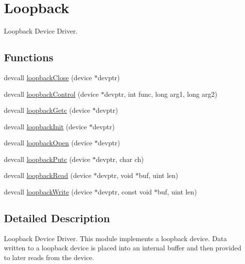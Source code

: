 \hypertarget{group__loopback}{\section{Loopback}
\label{group__loopback}
}


Loopback Device Driver.  


\subsection*{Functions}
\begin{DoxyCompactItemize}
\item 
devcall \hyperlink{group__loopback_ga9aca156eb06d8c13bc3bf35e41abb581}{loopback\-Close} (device $\ast$devptr)
\item 
devcall \hyperlink{group__loopback_ga38557e79b7cf307a7182e0b4e6cc4bd4}{loopback\-Control} (device $\ast$devptr, int func, long arg1, long arg2)
\item 
devcall \hyperlink{group__loopback_gaded6cc6dd823aa30128f07bfc2cb3cdb}{loopback\-Getc} (device $\ast$devptr)
\item 
devcall \hyperlink{group__loopback_ga3ea02fb1e741122fa5d352580693905c}{loopback\-Init} (device $\ast$devptr)
\item 
devcall \hyperlink{group__loopback_gabc2f963fc9113f9f03b6924f051f0d14}{loopback\-Open} (device $\ast$devptr)
\item 
devcall \hyperlink{group__loopback_gacfcefd30f0568e628c5d908e19ea7f71}{loopback\-Putc} (device $\ast$devptr, char ch)
\item 
devcall \hyperlink{group__loopback_gadfd7b5c850dc71e89def9e5a5d067997}{loopback\-Read} (device $\ast$devptr, void $\ast$buf, uint len)
\item 
devcall \hyperlink{group__loopback_ga6b7827f78cad08b666aa5010c423f98c}{loopback\-Write} (device $\ast$devptr, const void $\ast$buf, uint len)
\end{DoxyCompactItemize}


\subsection{Detailed Description}
Loopback Device Driver. This module implements a loopback device. Data written to a loopback device is placed into an internal buffer and then provided to later reads from the device. 

